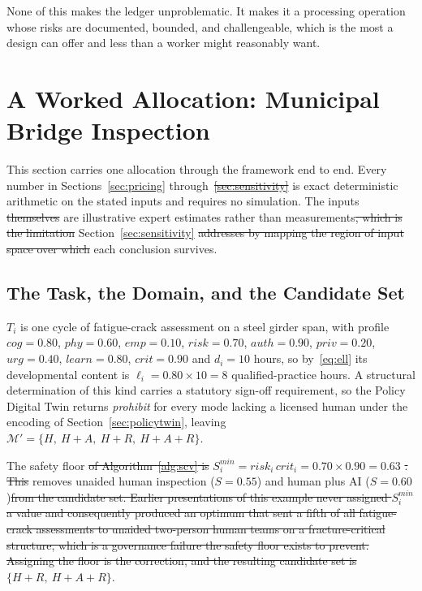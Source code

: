 \documentclass[utf8]{FrontiersinHarvard}
\providecommand{\DIFadd}[1]{{\protect\color{blue}\uwave{#1}}} %
\providecommand{\DIFdel}[1]{{\protect\color{red}\sout{#1}}}                      %
\providecommand{\DIFaddbegin}{} %
\providecommand{\DIFaddend}{} %
\providecommand{\DIFdelbegin}{} %
\providecommand{\DIFdelend}{} %
\begin{document}
\DIFdelend None of this makes the ledger unproblematic. It makes it a processing operation whose risks are documented, bounded, and challengeable, which is the most a design can offer and less than a worker might reasonably want.
	\DIFdelbegin %

\DIFdelend \section{A Worked Allocation: Municipal Bridge Inspection}
	\label{sec:worked}

	This section carries one allocation through the framework end to end. Every number in Sections~\ref{sec:pricing} through~\DIFdelbegin \DIFdel{\ref{sec:sensitivity} }\DIFdelend \DIFaddbegin \DIFadd{\ref{sec:shocks} }\DIFaddend is exact deterministic arithmetic on the stated inputs and requires no simulation. The inputs \DIFdelbegin \DIFdel{themselves }\DIFdelend are illustrative expert estimates rather than measurements\DIFdelbegin \DIFdel{, which is the limitation }\DIFdelend \DIFaddbegin \DIFadd{; }\DIFaddend Section~\ref{sec:sensitivity} \DIFdelbegin \DIFdel{addresses by mapping the region of input space over which }\DIFdelend \DIFaddbegin \DIFadd{maps where }\DIFaddend each conclusion survives.

	\subsection{The Task, the Domain, and the Candidate Set}
	\label{sec:workedsetup}

	$T_i$ is one cycle of fatigue-crack assessment on a steel girder span, with profile $cog=0.80$, $phy=0.60$, $emp=0.10$, $risk=0.70$, $auth=0.90$, $priv=0.20$, $urg=0.40$, $learn=0.80$, $crit=0.90$ and $d_i=10$ hours, so by~\eqref{eq:ell} its developmental content is $\ell_i = 0.80 \times 10 = 8$ qualified-practice hours. A structural determination of this kind carries a statutory sign-off requirement, so the Policy Digital Twin returns \textit{prohibit} for every mode lacking a licensed human under the encoding of Section~\ref{sec:policytwin}, leaving $\mathcal{M}' = \{H,\ H{+}A,\ H{+}R,\ H{+}A{+}R\}$.

	The safety floor \DIFdelbegin \DIFdel{of Algorithm~\ref{alg:scv} is }\DIFdelend $S^{min}_i = risk_i\,crit_i = 0.70\times 0.90 = 0.63$ \DIFdelbegin \DIFdel{. This }\DIFdelend removes unaided human inspection ($S=0.55$) and human plus AI ($S=0.60$)\DIFdelbegin \DIFdel{from the candidate set. Earlier presentations of this example never assigned $S^{min}_i$ a value and consequently produced an optimum that sent a fifth of all fatigue-crack assessments to unaided two-person human teams on a fracture-critical structure, which is a governance failure the safety floor exists to prevent. Assigning the floor is the correction, and the resulting candidate set is }\DIFdelend \DIFaddbegin \DIFadd{, leaving }\DIFaddend $\{H{+}R,\ H{+}A{+}R\}$. \DIFdelbegin %
\end{document}
